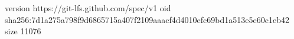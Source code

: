 version https://git-lfs.github.com/spec/v1
oid sha256:7d1a275a798f9d6865715a407f2109aaacf4d4010efc69bd1a513e5e60c1eb42
size 11076

